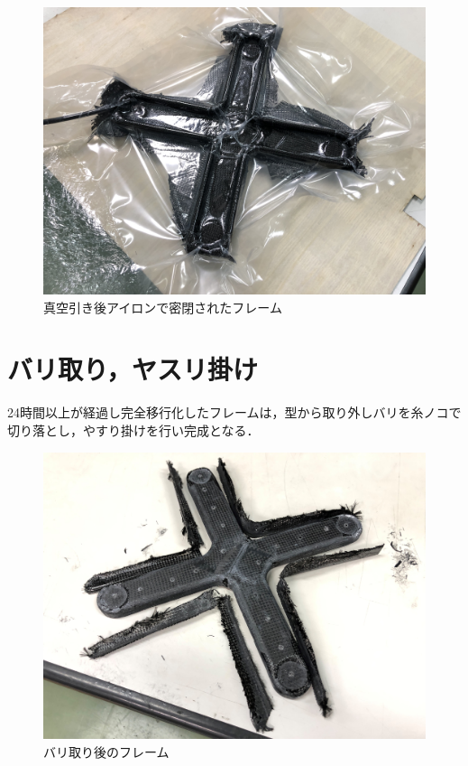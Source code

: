 \begin{figure}[htbp]
  \begin{center}
    \includegraphics[width=120mm]{img/１４.JPG}
    \end{center}
  \caption{真空引き後アイロンで密閉されたフレーム}
 \label{fig:robot}
\end{figure}

\section{バリ取り，ヤスリ掛け}
24時間以上が経過し完全移行化したフレームは，型から取り外しバリを糸ノコで切り落とし，やすり掛けを行い完成となる．

\begin{figure}[htbp]
  \begin{center}
    \includegraphics[width=120mm]{img/１５.JPG}
    \end{center}
  \caption{バリ取り後のフレーム}
 \label{fig:robot}
\end{figure}

